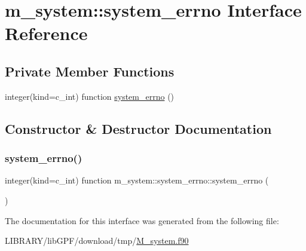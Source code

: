\hypertarget{interfacem__system_1_1system__errno}{}\section{m\+\_\+system\+:\+:system\+\_\+errno Interface Reference}
\label{interfacem__system_1_1system__errno}
\subsection*{Private Member Functions}
\begin{DoxyCompactItemize}
\item 
integer(kind=c\+\_\+int) function \hyperlink{interfacem__system_1_1system__errno_a6450910dca7e89b71a84745d95a52d79}{system\+\_\+errno} ()
\end{DoxyCompactItemize}


\subsection{Constructor \& Destructor Documentation}
\mbox{\label{interfacem__system_1_1system__errno_a6450910dca7e89b71a84745d95a52d79}} 
\subsubsection{\texorpdfstring{system\+\_\+errno()}{system\_errno()}}
{\footnotesize\ttfamily integer(kind=c\+\_\+int) function m\+\_\+system\+::system\+\_\+errno\+::system\+\_\+errno (\begin{DoxyParamCaption}{ }\end{DoxyParamCaption})\hspace{0.3cm}{\ttfamily [private]}}



The documentation for this interface was generated from the following file\+:\begin{DoxyCompactItemize}
\item 
L\+I\+B\+R\+A\+R\+Y/lib\+G\+P\+F/download/tmp/\hyperlink{M__system_8f90}{M\+\_\+system.\+f90}\end{DoxyCompactItemize}
